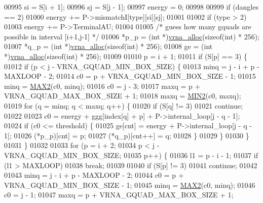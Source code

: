 \begin{DoxyCode}
00995   si      = S[i + 1];
00996   sj      = S[j - 1];
00997   energy  = 0;
00998 
00999   \textcolor{keywordflow}{if} (dangles == 2)
01000     energy += P->mismatchI[type][si][sj];
01001 
01002   \textcolor{keywordflow}{if} (type > 2)
01003     energy += P->TerminalAU;
01004 
01005   \textcolor{comment}{/* guess how many gquads are possible in interval [i+1,j-1] */}
01006   *p\_p  = (\textcolor{keywordtype}{int} *)\hyperlink{group__utils_gaf37a0979367c977edfb9da6614eebe99}{vrna\_alloc}(\textcolor{keyword}{sizeof}(\textcolor{keywordtype}{int}) * 256);
01007   *q\_p  = (\textcolor{keywordtype}{int} *)\hyperlink{group__utils_gaf37a0979367c977edfb9da6614eebe99}{vrna\_alloc}(\textcolor{keyword}{sizeof}(\textcolor{keywordtype}{int}) * 256);
01008   ge    = (\textcolor{keywordtype}{int} *)\hyperlink{group__utils_gaf37a0979367c977edfb9da6614eebe99}{vrna\_alloc}(\textcolor{keyword}{sizeof}(\textcolor{keywordtype}{int}) * 256);
01009 
01010   p = i + 1;
01011   \textcolor{keywordflow}{if} (S[p] == 3) \{
01012     \textcolor{keywordflow}{if} (p < j - VRNA\_GQUAD\_MIN\_BOX\_SIZE) \{
01013       minq  = j - i + p - MAXLOOP - 2;
01014       c0    = p + VRNA\_GQUAD\_MIN\_BOX\_SIZE - 1;
01015       minq  = \hyperlink{group__utils_ga33297b3679c713b0c4d897cd0fe3b122}{MAX2}(c0, minq);
01016       c0    = j - 3;
01017       maxq  = p + VRNA\_GQUAD\_MAX\_BOX\_SIZE + 1;
01018       maxq  = \hyperlink{group__utils_gae0b9cd0ce090bd69b951aa73e8fa4f7d}{MIN2}(c0, maxq);
01019       \textcolor{keywordflow}{for} (q = minq; q < maxq; q++) \{
01020         \textcolor{keywordflow}{if} (S[q] != 3)
01021           \textcolor{keywordflow}{continue};
01022 
01023         c0 = energy + ggg[index[q] + p] + P->internal\_loop[j - q - 1];
01024         \textcolor{keywordflow}{if} (c0 <= threshold) \{
01025           ge[cnt]       = energy + P->internal\_loop[j - q - 1];
01026           (*p\_p)[cnt]   = p;
01027           (*q\_p)[cnt++] = q;
01028         \}
01029       \}
01030     \}
01031   \}
01032 
01033   \textcolor{keywordflow}{for} (p = i + 2;
01034        p < j - VRNA\_GQUAD\_MIN\_BOX\_SIZE;
01035        p++) \{
01036     l1 = p - i - 1;
01037     \textcolor{keywordflow}{if} (l1 > MAXLOOP)
01038       \textcolor{keywordflow}{break};
01039 
01040     \textcolor{keywordflow}{if} (S[p] != 3)
01041       \textcolor{keywordflow}{continue};
01042 
01043     minq  = j - i + p - MAXLOOP - 2;
01044     c0    = p + VRNA\_GQUAD\_MIN\_BOX\_SIZE - 1;
01045     minq  = \hyperlink{group__utils_ga33297b3679c713b0c4d897cd0fe3b122}{MAX2}(c0, minq);
01046     c0    = j - 1;
01047     maxq  = p + VRNA\_GQUAD\_MAX\_BOX\_SIZE + 1;

\end{DoxyCode}
